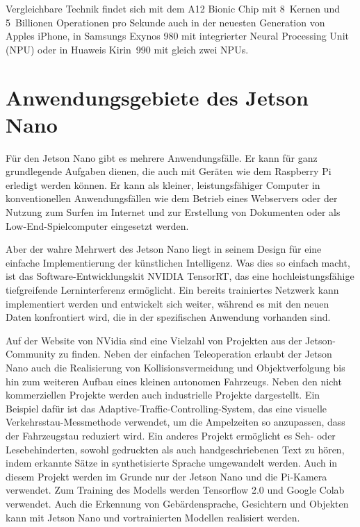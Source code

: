 \bigskip

Vergleichbare Technik findet sich mit dem A12 Bionic Chip mit 8~Kernen 
und 5~Billionen Operationen pro Sekunde auch in der neuesten 
Generation von Apples iPhone, in Samsungs Exynos 980 mit 
integrierter Neural Processing Unit (NPU) oder in Huaweis Kirin~990 mit gleich zwei NPUs. 
\cite{SamsungExynos980:2020,HuaweiKirin990:2020}



\section{Anwendungsgebiete des Jetson Nano}

Für den Jetson Nano gibt es mehrere Anwendungsfälle. Er kann für ganz grundlegende
Aufgaben dienen, die auch mit Geräten wie dem Raspberry Pi erledigt werden können. 
Er kann als kleiner, leistungsfähiger Computer in konventionellen Anwendungsfällen 
wie dem Betrieb eines Webservers oder der Nutzung zum Surfen im Internet und zur 
Erstellung von Dokumenten oder als Low-End-Spielcomputer eingesetzt werden. \cite{Kurniawan:2021}

\bigskip

Aber der wahre Mehrwert des Jetson Nano liegt in seinem Design für eine einfache Implementierung der künstlichen Intelligenz. 
Was dies so einfach macht, ist das Software-Entwicklungskit NVIDIA TensorRT, das eine hochleistungsfähige tiefgreifende Lerninterferenz ermöglicht. 
Ein bereits trainiertes Netzwerk kann implementiert werden und entwickelt sich weiter, 
während es mit den neuen Daten konfrontiert wird, die in der spezifischen Anwendung vorhanden sind.

\bigskip

Auf der Website \cite{JetsonProjects:2020} von NVidia sind
eine Vielzahl von Projekten aus der Jetson-Community zu finden. 
Neben der einfachen Teleoperation erlaubt der Jetson Nano auch die Realisierung von Kollisionsvermeidung und Objektverfolgung bis hin zum weiteren Aufbau eines kleinen autonomen Fahrzeugs. Neben den nicht kommerziellen Projekte werden auch industrielle Projekte dargestellt.
Ein Beispiel dafür ist das Adaptive-Traffic-Controlling-System, das eine visuelle Verkehrsstau-Messmethode verwendet, um die Ampelzeiten so anzupassen, dass der Fahrzeugstau reduziert wird. Ein anderes Projekt ermöglicht es Seh- oder Lesebehinderten, sowohl gedruckten als auch handgeschriebenen Text zu hören, indem erkannte Sätze in synthetisierte Sprache umgewandelt werden. 
Auch in diesem Projekt werden im Grunde nur der Jetson Nano und die Pi-Kamera verwendet. 
Zum Training des Modells werden Tensorflow 2.0 und Google Colab verwendet.
Auch die Erkennung von Gebärdensprache, Gesichtern und Objekten kann mit Jetson Nano und vortrainierten Modellen realisiert werden.
